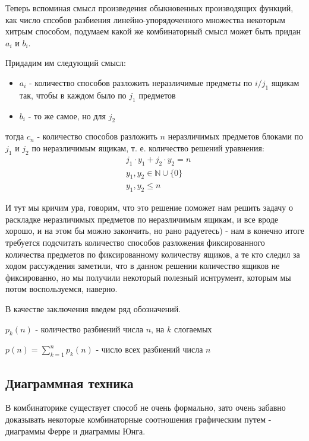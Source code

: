 Теперь вспоминая смысл произведения обыкновенных производящих функций, как число спсобов разбиения линейно-упорядоченного множества некоторым хитрым способом, подумаем какой же комбинаторный смысл может быть придан $a_i$ и $b_i$.

Придадим им следующий смысл:
\begin{itemize}
\item $a_i$ - количество способов разложить неразличимые предметы по $i/j_1$ ящикам так, чтобы в каждом было по $j_1$ предметов

\item $b_i$ - то же самое, но для $j_2$
\end{itemize}

тогда $c_n$ - количество способов разложить $n$ неразличимых предметов блоками по $j_1$ и $j_2$ по неразличимым ящикам, т. е. количество решений уравнения:
\[
	\begin{split}
		& j_1 \cdot y_1 + j_2 \cdot y_2 = n \\
		& y_1,y_2 \in \mathbb{N}\cup\{0\} \\
		& y_1,y_2 \le n
	\end{split}
\]

И тут мы кричим ура, говорим, что это решение поможет нам решить задачу о раскладке неразличимых предметов по неразличимым ящикам, и все вроде хорошо, и на этом бы можно закончить, но рано радуетесь) - нам в конечно итоге требуется подсчитать количество способов разложения фиксированного количества предметов по фиксированному количеству ящиков, а те кто следил за ходом рассуждения заметили, что в данном решении количество ящиков не фиксированно, но мы получили некоторый полезный иснтрумент, которым мы потом воспользуемся, наверно.

В качестве заключения введем ряд обозначений.

\begin{Def}
$p_k\left(n\right)$ - количество разбиений числа $n$, на $k$ слогаемых

$p\left(n\right) = \sum_{k=1}^n p_k\left(n\right)$ - число всех разбиений числа $n$
\end{Def}

\subsection{Диаграммная техника}

В комбинаторике существует способ не очень формально, зато очень забавно доказывать некоторые комбинаторные соотношения графическим путем - диаграммы Ферре и диаграммы Юнга.

